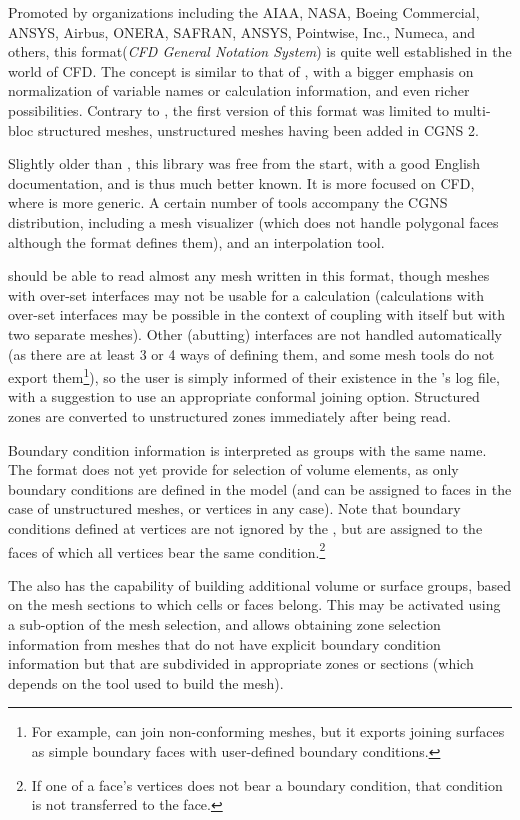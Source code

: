 {{{{
\label{sec:fmtdesc_cgns}

Promoted by organizations including the AIAA, NASA, Boeing Commercial, ANSYS,
Airbus, ONERA, SAFRAN, ANSYS, Pointwise, Inc., Numeca, and others,
this format(\emph{CFD General Notation System}) is quite well established in
the world of CFD. The concept is similar to that of \med, with a bigger
emphasis on normalization of variable names or calculation information, and
even richer possibilities. Contrary to \med, the first version of this format
was limited to multi-bloc structured meshes, unstructured meshes having been
added in CGNS 2.

Slightly older than \med, this library was free from the start, with a good
English documentation, and is thus much better known. It is more focused
on CFD, where \med is more generic. A certain number of tools accompany
the CGNS distribution, including a mesh visualizer (which does not handle
polygonal faces although the format defines them), and an interpolation
tool.

\CS should be able to read almost any mesh written in this format, though
meshes with over-set interfaces may not be usable for a calculation
(calculations with over-set interfaces may be possible in the context of coupling \CS
with itself but with two separate meshes).
Other (abutting) interfaces are not handled automatically (as there are
at least 3 or 4 ways of defining them, and some mesh tools do not export
them\footnote{For example, \icemcfd can join non-conforming meshes, but it
exports joining surfaces as simple boundary faces with user-defined boundary
conditions.}), so the user is simply informed of their existence in the
\pcs's log file, with a suggestion to use an appropriate conformal joining
option. Structured zones are converted to unstructured zones immediately after
being read.

Boundary condition information is interpreted as groups with the same
name. The format does not yet provide for selection of volume elements,
as only boundary conditions are defined in the model (and can be assigned to
faces in the case of unstructured meshes, or vertices in any case).
Note that boundary conditions defined at vertices are not ignored by
the \pcs, but are assigned to the faces of which all vertices bear
the same condition.\footnote{If one of a face's vertices does not bear
a boundary condition, that condition is not transferred to the face.}

The \pcs also has the capability of building additional volume or surface groups,
based on the mesh sections to which cells or faces belong. This may be
activated using a sub-option of the mesh selection, and allows obtaining
zone selection information from meshes that do not have explicit
boundary condition information but that are subdivided in appropriate zones or
sections (which depends on the tool used to build the mesh).

}}}}
